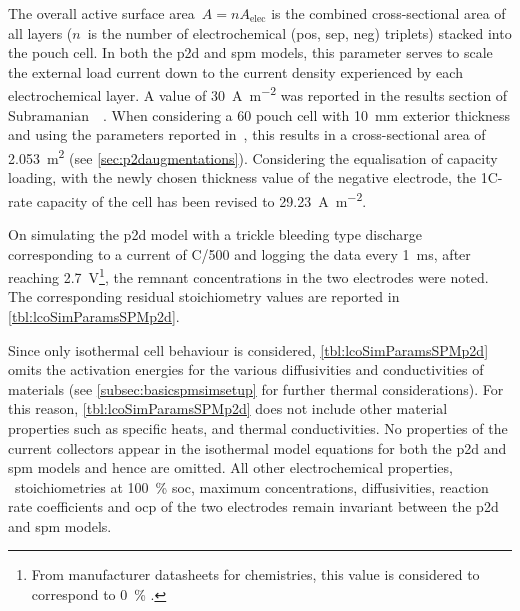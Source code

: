The  overall  active  surface  area~${A  = n  A_\text{elec}}$  is  the  combined
cross-sectional area of  all layers ($n$~is the number  of electrochemical (pos,
sep,  neg)  triplets)  stacked  into  the pouch  cell.  In  both  the  \gls{p2d}
and  \gls{spm}  models,  this  parameter  serves  to  scale  the  external  load
current  down  to  the  current  density  experienced  by  each  electrochemical
layer.  A   value  of  \approx\SI{30}{\ampere\per\meter\squared}   was  reported
in  the  results  section  of  Subramanian~\etal{}~\cite{Subramanian2009}.  When
considering a  \SI{60}{\amphour} pouch cell with  \SI{10}{\milli\meter} exterior
thickness   and  using   the   parameters  reported   in~\cite{Subramanian2009},
this  results  in  a  cross-sectional area  of  \SI{2.053}{\meter\squared}  (see
\cref{sec:p2daugmentations}). Considering the  equalisation of capacity loading,
with the  newly chosen thickness  value of  the negative electrode,  the 1C-rate
capacity of the cell has been revised to \SI{29.23}{\ampere\per\meter\squared}.

On  simulating  the \gls{p2d}  model  with  a  trickle bleeding  type  discharge
corresponding   to   a  current   of   C/500   and   logging  the   data   every
\SI{1}{\milli\second}, after reaching \SI{2.7}{\volt}\footnote{From manufacturer
datasheets  for   chemistries,  this value  is considered  to
correspond to \SI{0}{\percent} .}, the remnant concentrations
in  the two  electrodes  were noted.  The  corresponding residual  stoichiometry
values are reported in \cref{tbl:lcoSimParamsSPMp2d}.


Since      only      isothermal      cell     behaviour      is      considered,
\cref{tbl:lcoSimParamsSPMp2d}    omits     the    activation     energies    for
the    various   diffusivities    and   conductivities    of   materials    (see
\cref{subsec:basicspmsimsetup}  for further  thermal  considerations). For  this
reason, \cref{tbl:lcoSimParamsSPMp2d} does not include other material properties
such as specific heats, and thermal conductivities. No properties of the current
collectors appear in  the isothermal model equations for both  the \gls{p2d} and
\gls{spm} models  and hence are  omitted. All other  electrochemical properties,
\viz~stoichiometries  at \SI{100}{\percent}  \gls{soc}, maximum  concentrations,
diffusivities, reaction  rate coefficients and  \gls{ocp} of the  two electrodes
remain invariant between the \gls{p2d} and \gls{spm} models.

